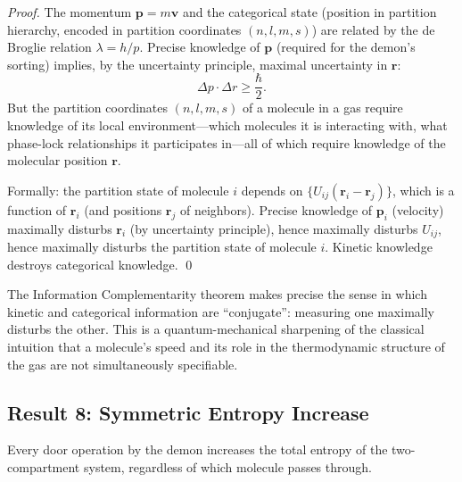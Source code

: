 \begin{proof}
The momentum $\mathbf{p} = m\mathbf{v}$ and the categorical state (position in
partition hierarchy, encoded in partition coordinates $(n, l, m, s)$) are
related by the de Broglie relation $\lambda = h/p$. Precise knowledge of
$\mathbf{p}$ (required for the demon's sorting) implies, by the uncertainty
principle, maximal uncertainty in $\mathbf{r}$:
\begin{equation}
  \Delta p \cdot \Delta r \geq \frac{\hbar}{2}.
  \label{eq:heisenberg_momentum_position}
\end{equation}
But the partition coordinates $(n, l, m, s)$ of a molecule in a gas require
knowledge of its local environment---which molecules it is interacting with,
what phase-lock relationships it participates in---all of which require
knowledge of the molecular position $\mathbf{r}$.

Formally: the partition state of molecule $i$ depends on $\{U_{ij}(\mathbf{r}_i - \mathbf{r}_j)\}$,
which is a function of $\mathbf{r}_i$ (and positions $\mathbf{r}_j$ of neighbors).
Precise knowledge of $\mathbf{p}_i$ (velocity) maximally disturbs $\mathbf{r}_i$
(by uncertainty principle), hence maximally disturbs $U_{ij}$, hence maximally
disturbs the partition state of molecule $i$. Kinetic knowledge destroys
categorical knowledge. \qed
\end{proof}

\begin{remark}
The Information Complementarity theorem makes precise the sense in which kinetic
and categorical information are ``conjugate'': measuring one maximally disturbs
the other. This is a quantum-mechanical sharpening of the classical intuition
that a molecule's speed and its role in the thermodynamic structure of the
gas are not simultaneously specifiable.
\end{remark}

\subsection{Result 8: Symmetric Entropy Increase}

\begin{theorem}
\label{thm:symmetric_entropy}
Every door operation by the demon increases the total entropy of the two-compartment
system, regardless of which molecule passes through.
\end{theorem}

